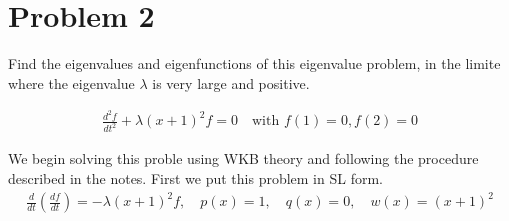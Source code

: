 \documentclass{article}
\begin{document}
\begin{enumerate}[label=\alph*.]
\end{enumerate}

\vspace{10pt}

\hline

\vspace{10pt}

\section*{Problem 2}
Find the eigenvalues and eigenfunctions of this eigenvalue problem, in the
limite where the eigenvalue $\lambda$ is very large and positive. 

\begin{gather*}
    \frac{d^2f}{dt^2} + \lambda(x+1)^2f = 0 \quad \text{with } f(1) = 0, f(2) =
    0
\end{gather*}

We begin solving this proble using WKB theory and following the procedure
described in the notes. First we put this problem in SL form. 
\begin{gather*}
    \frac{d}{dt}\left(\frac{df}{dt}\right) = -\lambda(x+1)^2f, \quad p(x) = 1,
    \quad q(x) = 0, \quad w(x) = (x+1)^2
\end{gather*}
\end{document}
